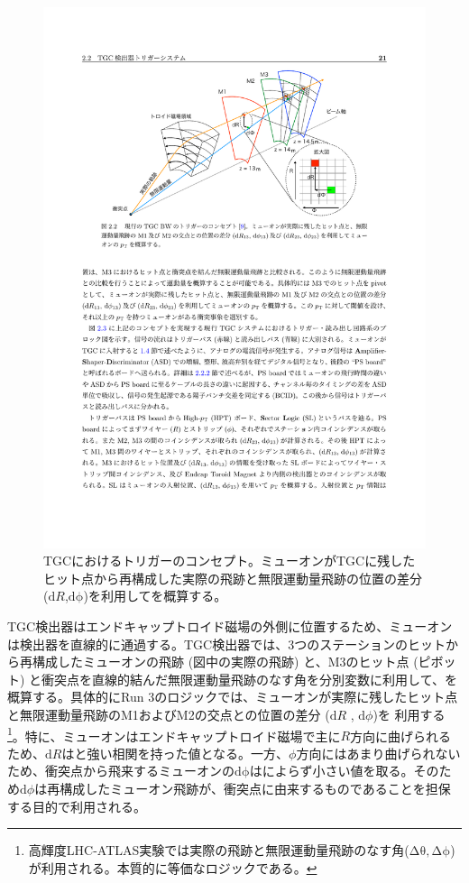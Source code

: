 \begin{figure} 
\centering
\includegraphics[width=16cm]{fig/Intro/TGC_triggerconcept.pdf}
\caption[TGCにおけるトリガーのコンセプト]{TGCにおけるトリガーのコンセプト\cite{mt_akatsuka}。ミューオンがTGCに残したヒット点から再構成した実際の飛跡と無限運動量飛跡の位置の差分 ($\mathrm{d}R$,$\mathrm{d\phi}$)を利用して\pt を概算する。}
\label{TGC_triggerconcept}
\end{figure}

TGC検出器はエンドキャップトロイド磁場の外側に位置するため、ミューオンは検出器を直線的に通過する。TGC検出器では、3つのステーションのヒットから再構成したミューオンの飛跡 (図中の実際の飛跡) と、M3のヒット点 (ピボット) と衝突点を直線的結んだ無限運動量飛跡のなす角を分別変数に利用して、\pt を概算する。具体的にRun 3のロジックでは、ミューオンが実際に残したヒット点と無限運動量飛跡のM1およびM2の交点との位置の差分  ($\mathrm{d}R$ , $\mathrm{d}\phi$)を 利用する\footnote{高輝度LHC-ATLAS実験では実際の飛跡と無限運動量飛跡のなす角($\mathrm{\Delta\theta, \Delta\phi}$)が利用される。本質的に等価なロジックである。}。特に、ミューオンはエンドキャップトロイド磁場で主に$R$方向に曲げられるため、$\mathrm{d}R$は\pt と強い相関を持った値となる。一方、$\phi$方向にはあまり曲げられないため、衝突点から飛来するミューオンの$\mathrm{d\phi}$は\pt によらず小さい値を取る。そのため$\mathrm{d}\phi$は再構成したミューオン飛跡が、衝突点に由来するものであることを担保する目的で利用される。

